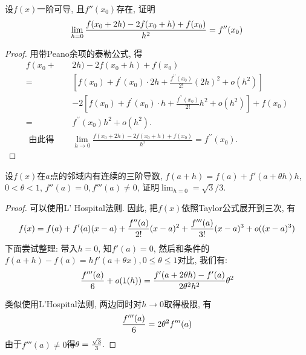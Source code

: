 
\begin{prob}\label{lem:a1}%
    设$f(x)$一阶可导, 且$f''(x_0)$存在, 证明
    $$
    \lim_{h=0}{f(x_0+2h)-2f(x_0+h)+f(x_0)\over h^2}=f''(x_0)
    $$
\end{prob}

\begin{proof}
    用带Peano余项的泰勒公式, 得
$$
\begin{aligned}
f\left(x_{0}+\right.&2 h)-2 f\left(x_{0}+h\right)+f\left(x_{0}\right) \\
=& {\left[f\left(x_{0}\right)+f^{\prime}\left(x_{0}\right) \cdot 2 h+\frac{f^{\prime \prime}\left(x_{0}\right)}{2 !}(2 h)^{2}+o\left(h^{2}\right)\right] } \\
&-2\left[f\left(x_{0}\right)+f^{\prime}\left(x_{0}\right) \cdot h+\frac{f^{\prime \prime}\left(x_{0}\right)}{2 !} h^{2}+o\left(h^{2}\right)\right]+f\left(x_{0}\right) \\
=& f^{\prime \prime}\left(x_{0}\right) h^{2}+o\left(h^{2}\right) . \\
\text { 由此得 } \quad & \lim _{h \rightarrow 0} \frac{f\left(x_{0}+2 h\right)-2 f\left(x_{0}+h\right)+f\left(x_{0}\right)}{h^{2}}=f^{\prime \prime}\left(x_{0}\right) .
\end{aligned}
$$
\end{proof}


\begin{prob}%
设$f(x)$在$a$点的邻域内有连续的三阶导数, $f(a+h)=f(a)+f'(a+\theta h)h$, $0<\theta <1$, $f''(a)=0, f'''(a) \neq 0$, 证明$\lim_{h=0}=\sqrt{3}/3$.
\end{prob}

\begin{proof}
    可以使用L' Hospital法则. 
    因此, 把$f(x)$依照Taylor公式展开到三次, 有
    $$
    f(x)=f(a) + f'(a)(x-a) + {f''(a)\over 2!}(x-a)^2+{f'''(a)\over 3!}(x-a)^3+o((x-a)^3)
    $$
    下面尝试整理: 带入$h=0$, 知$f'(a)=0$, 然后和条件的$f(a+h)-f(a)=hf'(a+\theta x), 0\leq \theta \leq 1$对比, 我们有: 
    $$
    {f'''(a)\over 6}+o(1(h)) = {f'(a+2\theta h)-f'(a) \over 2\theta ^2 h^2}\theta ^2
    $$

    类似使用L'Hospital法则, 两边同时对$h\to 0$取得极限, 有
    $$
    {f'''(a)\over 6} = {2 \theta^2 f'''(a)}
    $$
    由于$f'''(a)\neq 0$得$\theta={\sqrt{3} \over 3}$. 

\end{proof}


